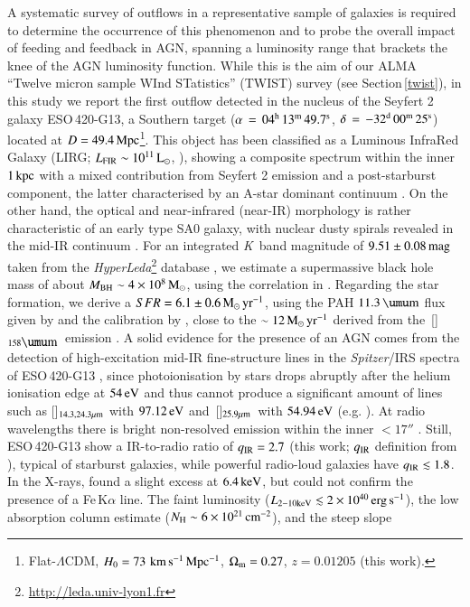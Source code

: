 \documentclass[longauth]{aa}
\newcommand{\kms}{\,\hbox{\hbox{km}\,\hbox{s}$^{-1}$}}
\newcommand{\oiv}{\,\hbox{[\ion{O}{iv}]$_{\rm 25.9 \mu m}$}}
\newcommand{\cii}{\,\hbox{[\ion{C}{ii}]$_{\rm 158 \micron}$}}
\def\micron{\hbox{$\umu$m}}
\begin{document}
A systematic survey of outflows in a representative sample of galaxies is required to determine the occurrence of this phenomenon and to probe the overall impact of feeding and feedback in AGN, spanning a luminosity range that brackets the knee of the AGN luminosity function. While this is the aim of our ALMA ``Twelve micron sample WInd STatistics'' (TWIST) survey (see Section\,\ref{twist}), in this study we report the first outflow detected in the nucleus of the Seyfert 2 galaxy ESO\,420-G13, a Southern target (\mbox{$\alpha\,=\,\rm{04^{h}\,13^{m}\,49.7^{s}}$}, \mbox{$\delta\,=\,\rm{-32^{d}\,00^{m}\,25^{s}}$}) located at $D = 49.4\, \rm{Mpc}$\footnote{Flat-$\Lambda$CDM, $H_0 = 73\, \rm{\kms\,Mpc^{-1}}$, $\Omega_{\rm m} = 0.27$, $z = 0.01205$ (this work).}. This object has been classified as a Luminous InfraRed Galaxy (LIRG; $L_{\rm FIR} \sim 10^{11}\, \rm{L_\odot}$, ), showing a composite spectrum within the inner $1\, \rm{kpc}$ with a mixed contribution from Seyfert 2 emission and a post-starburst component, the latter characterised by an A-star dominant continuum . On the other hand, the optical and near-infrared (near-IR) morphology is rather characteristic of an early type SA0 galaxy, with nuclear dusty spirals revealed in the mid-IR continuum . For an integrated \textit{K}~band magnitude of $9.51 \pm 0.08\, \rm{mag}$ taken from the \textit{HyperLeda}\footnote{\url{http://leda.univ-lyon1.fr}} database , we estimate a supermassive black hole mass of about $M_{\rm BH} \sim 4 \times 10^8\, \rm{M_\odot}$, using the correlation in . Regarding the star formation, we derive a $SFR = 6.1 \pm 0.6\, \rm{M_\odot\,yr^{-1}}$, using the PAH $11.3 \, \rm{\micron}$ flux given by  and the calibration by , close to the $\sim 12\, \rm{M_\odot\,yr^{-1}}$ derived from the \cii \ emission . A solid evidence for the presence of an AGN comes from the detection of high-excitation mid-IR fine-structure lines in the \textit{Spitzer}/IRS spectra of ESO\,420-G13 , since photoionisation by stars drops abruptly after the helium ionisation edge at $54\, \rm{eV}$ and thus cannot produce a significant amount of lines such as []$_{\rm 14.3, 24.3 \mu m}$ with $97.12\, \rm{eV}$ and \oiv \ with $54.94\, \rm{eV}$ (e.g. ). At radio wavelengths there is bright non-resolved emission within the inner $< 17''$ . Still, ESO\,420-G13 show a IR-to-radio ratio of $q_{\rm IR} = 2.7$ (this work; $q_{\rm IR}$ definition from ), typical of starburst galaxies, while powerful radio-loud galaxies have $q_{\rm IR} \lesssim 1.8$. In the X-rays,  found a slight excess at $6.4\, \rm{keV}$, but could not confirm the presence of a Fe\,K$\alpha$ line. The faint luminosity ($L_{\rm 2-10 keV} \lesssim 2 \times 10^{40}\, \rm{erg\,s^{-1}}$), the low absorption column estimate ($N_{\rm H} \sim 6 \times 10^{21}\, \rm{cm^{-2}}$), and the steep slope 
\end{document}
